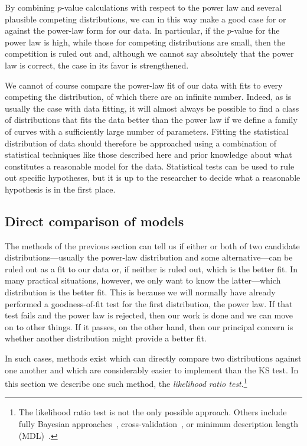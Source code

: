 \documentclass[final]{siamltex}
\newcommand{\defn}{\textit}
\begin{document}
By combining $p$-value calculations with respect to the power law and
several plausible competing distributions, we can in this way make a good
case for or against the power-law form for our data.  In particular, if the
$p$-value for the power law is high, while those for competing
distributions are small, then the competition is ruled out and, although we
cannot say absolutely that the power law is correct, the case in its favor
is strengthened.

We cannot of course compare the power-law fit of our data with fits to
every competing the distribution, of which there are an infinite number.
Indeed, as is usually the case with data fitting, it will almost always be
possible to find a class of distributions that fits the data better than
the power law if we define a family of curves with a sufficiently large
number of parameters.  Fitting the statistical distribution of data should
therefore be approached using a combination of statistical techniques like
those described here and prior knowledge about what constitutes a
reasonable model for the data.  Statistical tests can be used to rule out
specific hypotheses, but it is up to the researcher to decide what a
reasonable hypothesis is in the first place.


\subsection{Direct comparison of models}
\label{sec:LRT}
The methods of the previous section can tell us if either or both of two
candidate distributions---usually the power-law distribution and some
alternative---can be ruled out as a fit to our data or, if neither is ruled
out, which is the better fit.  In many practical situations, however, we
only want to know the latter---which distribution is the better fit.  This
is because we will normally have already performed a goodness-of-fit test
for the first distribution, the power law.  If that test fails and the
power law is rejected, then our work is done and we can move on to other
things.  If it passes, on the other hand, then our principal concern is whether
another distribution might provide a better fit.

In such cases, methods exist which can directly compare two distributions
against one another and which are considerably easier to implement than the
KS test.  In this section we describe one such method, the \defn{likelihood
 ratio test}.\footnote{The likelihood ratio test is not the only possible
 approach.  Others include fully Bayesian
 approaches~\cite{kass:raftery:1995}, cross-validation~\cite{stone:1974},
 or minimum description length (MDL)~\cite{grunwald:2007}.}
\end{document}
